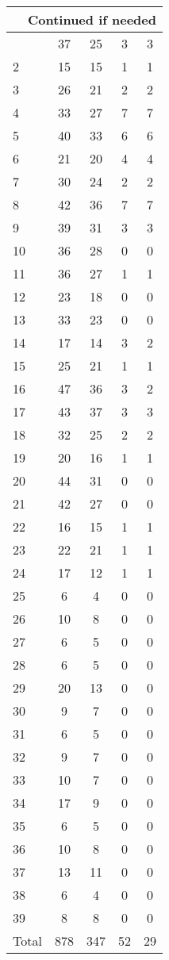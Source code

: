 \begin{center}
\begin{longtable}{l|c|c|c|c}
\hline \multicolumn{5}{|r|}{{Continued if needed}} \\ \hline
\endfoot 
1 & 37 & 25 & 3 & 3\\ \hline
2 & 15 & 15 & 1 & 1\\ \hline
3 & 26 & 21 & 2 & 2\\ \hline
4 & 33 & 27 & 7 & 7\\ \hline
5 & 40 & 33 & 6 & 6\\ \hline
6 & 21 & 20 & 4 & 4\\ \hline
7 & 30 & 24 & 2 & 2\\ \hline
8 & 42 & 36 & 7 & 7\\ \hline
9 & 39 & 31 & 3 & 3\\ \hline
10 & 36 & 28 & 0 & 0\\ \hline
11 & 36 & 27 & 1 & 1\\ \hline
12 & 23 & 18 & 0 & 0\\ \hline
13 & 33 & 23 & 0 & 0\\ \hline
14 & 17 & 14 & 3 & 2\\ \hline
15 & 25 & 21 & 1 & 1\\ \hline
16 & 47 & 36 & 3 & 2\\ \hline
17 & 43 & 37 & 3 & 3\\ \hline
18 & 32 & 25 & 2 & 2\\ \hline
19 & 20 & 16 & 1 & 1\\ \hline
20 & 44 & 31 & 0 & 0\\ \hline
21 & 42 & 27 & 0 & 0\\ \hline
22 & 16 & 15 & 1 & 1\\ \hline
23 & 22 & 21 & 1 & 1\\ \hline
24 & 17 & 12 & 1 & 1\\ \hline
25 & 6 & 4 & 0 & 0\\ \hline
26 & 10 & 8 & 0 & 0\\ \hline
27 & 6 & 5 & 0 & 0\\ \hline
28 & 6 & 5 & 0 & 0\\ \hline
29 & 20 & 13 & 0 & 0\\ \hline
30 & 9 & 7 & 0 & 0\\ \hline
31 & 6 & 5 & 0 & 0\\ \hline
32 & 9 & 7 & 0 & 0\\ \hline
33 & 10 & 7 & 0 & 0\\ \hline
34 & 17 & 9 & 0 & 0\\ \hline
35 & 6 & 5 & 0 & 0\\ \hline
36 & 10 & 8 & 0 & 0\\ \hline
37 & 13 & 11 & 0 & 0\\ \hline
38 & 6 & 4 & 0 & 0\\ \hline
39 & 8 & 8 & 0 & 0\\ \hline
\hline \hline
Total & 878 & 347 & 52 & 29



\end{longtable}
\end{center}

